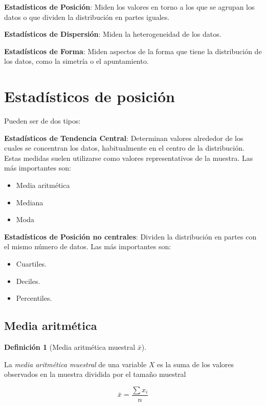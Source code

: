 \documentclass[
  spanish,
  a4paper,
]{scrreport}
\providecommand{\tightlist}{%
  \setlength{\itemsep}{0pt}\setlength{\parskip}{0pt}}
\theoremstyle{plain}
\theoremstyle{definition}
\theoremstyle{definition}
\newtheorem{definition}{Definición}[chapter]
\theoremstyle{remark}
\begin{document}
\textbf{Estadísticos de Posición}: Miden los valores en torno a los que
se agrupan los datos o que dividen la distribución en partes iguales.

\textbf{Estadísticos de Dispersión}: Miden la heterogeneidad de los
datos.

\textbf{Estadísticos de Forma}: Miden aspectos de la forma que tiene la
distribución de los datos, como la simetría o el apuntamiento.

\section{Estadísticos de posición}\label{estaduxedsticos-de-posiciuxf3n}

Pueden ser de dos tipos:

\textbf{Estadísticos de Tendencia Central}: Determinan valores alrededor
de los cuales se concentran los datos, habitualmente en el centro de la
distribución. Estas medidas suelen utilizarse como valores
representativos de la muestra. Las más importantes son:

\begin{itemize}
\tightlist
\item
  Media aritmética
\item
  Mediana
\item
  Moda
\end{itemize}

\textbf{Estadísticos de Posición no centrales}: Dividen la distribución
en partes con el mismo número de datos. Las más importantes son:

\begin{itemize}
\tightlist
\item
  Cuartiles.
\item
  Deciles.
\item
  Percentiles.
\end{itemize}

\subsection{Media aritmética}\label{media-aritmuxe9tica}

\begin{definition}[Media aritmética muestral
\(\bar{x}\)]\protect\hypertarget{def-media-aritmetica}{}\label{def-media-aritmetica}

La \emph{media aritmética muestral} de una variable \(X\) es la suma de
los valores observados en la muestra dividida por el tamaño muestral

\[\bar{x} = \frac{\sum x_i}{n}\]

\end{definition}
\end{document}
